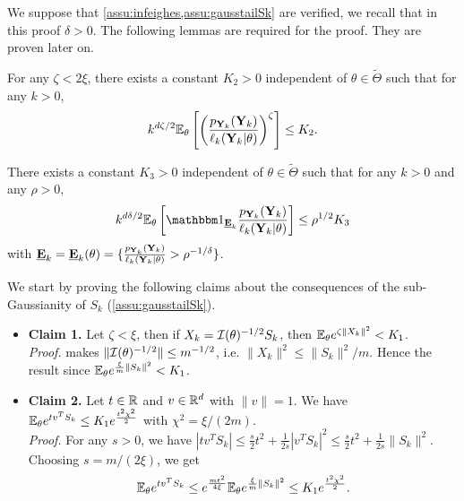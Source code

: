 \begin{proofb}
    We suppose that \cref{assu:infeighes,assu:gausstailSk} are verified, we recall that in this proof $\delta>0$. The following lemmas are required for the proof. They are proven later on.

    \begin{lem}\label{lem:technicalLemma}
        For any $\zeta<2\xi$, there exists a constant $K_2>0$ independent of $\theta\in\tilde\Theta$ such that for any $k>0$,
              \begin{equation}
                  k^{d\zeta/2}\mathbb{E}_\theta\left[\left(\frac{p_{\mathbf{Y}_k}(\mathbf{Y}_k)}{\ell_k(\mathbf{Y}_k|\theta)}\right)^\zeta\right]\leq K_2.
              \end{equation}
      \end{lem}    
      \begin{lem}\label{lem:lem2}
          There exists a constant $K_3>0$ independent of $\theta\in\tilde\Theta$ %
          such that for any $k>0$ and any $\rho>0$, %
          \begin{equation}
            k^{d\delta/2} \EE_\theta\left[ \indic_{\underline{\mbf E}_k} \frac{p_{\mbf Y_k}(\mbf Y_k)}{\ell_k(\mbf Y_k|\theta)} \right] \leq \rho^{1/2} K_3 
          \end{equation}
          with $\underline{\mathbf{E}}_k = \underline{\mathbf{E}}_k(\theta)=\{ \frac{p_{\mathbf{Y}_k}(\mathbf{Y}_k)}{\ell_k(\mathbf{Y}_k|\theta)}>\rho^{-1/\delta}\}$.
      \end{lem}

      We start by proving the following claims about the consequences of the sub-Gaussianity of $S_k$ (\cref{assu:gausstailSk}).
      \begin{itemize}
        \item \textbf{Claim 1.} Let $\zeta<\xi$, then if $X_k=\mathcal{I}(\theta)^{-1/2}S_k$, then $\mathbb{E}_\theta e^{\zeta\|X_k\|^2} < K_1$.\\
            \emph{Proof.}  makes $\|\mathcal{I}(\theta)^{-1/2}\|\leq m^{-1/2}$, i.e. $\| X_k\|^2\leq \| S_k \|^2/m$. Hence the result since $\mathbb{E}_\theta e^{\frac{\xi}{m}\|S_k\|^2}<K_1$.
        \item \textbf{Claim 2.} Let $t\in\mathbb{R}$ and $v\in\mathbb{R}^d$ with $\|v\|=1$. We have $\mathbb{E}_\theta e^{tv^TS_k}\leq K_1 e^{\frac{t^2\chi^2}{2}}$ with $\chi^2=\xi/(2m)$.\\
            \emph{Proof.} For any $s >0$, we have 
$|tv^TS_k|\leq \frac{s}{2} t^2 +\frac{1}{2s} |v^TS_k|^2 \leq  \frac{s}{2} t^2 +\frac{1}{2s} \|S_k\|^2 $.
Choosing $s=m/(2\xi)$, we get
\begin{equation}
    \mathbb{E}_\theta e^{tv^TS_k} \leq 
e^{\frac{m t^2}{4\xi}} \mathbb{E}_{\theta} e^{ \frac{\xi}{m} \|S_k\|^2} \leq K_1 e^{ \frac{t^2\chi^2}{2}}.
\end{equation}
      \end{itemize}


\end{proofb}
